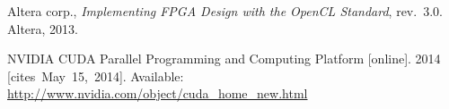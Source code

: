{\begin{thebibliography}{99}
			Altera corp., \textit{Implementing FPGA Design with
				the OpenCL Standard}, rev.~3.0. Altera, 2013.
		
			NVIDIA CUDA Parallel Programming and Computing Platform [online].
			2014 [cites~May~15,~2014].
			Available: \url{http://www.nvidia.com/object/cuda_home_new.html}
		
		
		
		
		
		
		
		
		
		
		

\end{thebibliography}}
